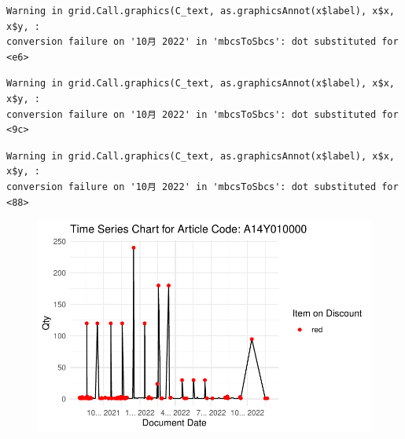 \documentclass[
  letterpaper,
  DIV=11,
  numbers=noendperiod]{scrartcl}
\begin{document}
\begin{verbatim}
Warning in grid.Call.graphics(C_text, as.graphicsAnnot(x$label), x$x, x$y, :
conversion failure on '10月 2022' in 'mbcsToSbcs': dot substituted for <e6>
\end{verbatim}

\begin{verbatim}
Warning in grid.Call.graphics(C_text, as.graphicsAnnot(x$label), x$x, x$y, :
conversion failure on '10月 2022' in 'mbcsToSbcs': dot substituted for <9c>
\end{verbatim}

\begin{verbatim}
Warning in grid.Call.graphics(C_text, as.graphicsAnnot(x$label), x$x, x$y, :
conversion failure on '10月 2022' in 'mbcsToSbcs': dot substituted for <88>
\end{verbatim}

\begin{figure}[H]

{\centering \includegraphics{Time-Serise-EDA_files/figure-pdf/unnamed-chunk-1-2.pdf}

}

\end{figure}
\end{document}
